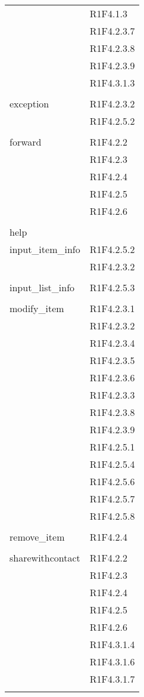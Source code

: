 \begin{center}
\begin{longtable}{|p{7cm}|p{5cm}|}
\\ & R1F4.1.3 \\ & R1F4.2.3.7 \\ & R1F4.2.3.8 \\ & R1F4.2.3.9 \\ & R1F4.3.1.3 \\ & \\ \hline
		exception & R1F4.2.3.2 \\ & R1F4.2.5.2 \\ & \\ \hline
		forward & R1F4.2.2 \\ & R1F4.2.3 \\ & R1F4.2.4 \\ & R1F4.2.5 \\ & R1F4.2.6 \\ & \\ \hline
		help & \\ \hline
		input\_item\_info & R1F4.2.5.2 \\ & R1F4.2.3.2 \\ & \\ \hline
		input\_list\_info & R1F4.2.5.3 \\ & \\ \hline
		modify\_item & R1F4.2.3.1 \\ & R1F4.2.3.2 \\ & R1F4.2.3.4 \\ & R1F4.2.3.5 \\ & R1F4.2.3.6 \\ & R1F4.2.3.3 \\ & R1F4.2.3.8 \\ & R1F4.2.3.9 \\ & R1F4.2.5.1 \\ & R1F4.2.5.4 \\ & R1F4.2.5.6 \\ & R1F4.2.5.7 \\ & R1F4.2.5.8 \\ & \\ \hline
		remove\_item & R1F4.2.4 \\ & \\ \hline
		sharewithcontact & R1F4.2.2 \\ & R1F4.2.3 \\ & R1F4.2.4 \\ & R1F4.2.5 \\ & R1F4.2.6 \\ & R1F4.3.1.4 \\ & R1F4.3.1.6 \\ & R1F4.3.1.7 \\ & \\ \hline

\end{longtable}
\end{center}
